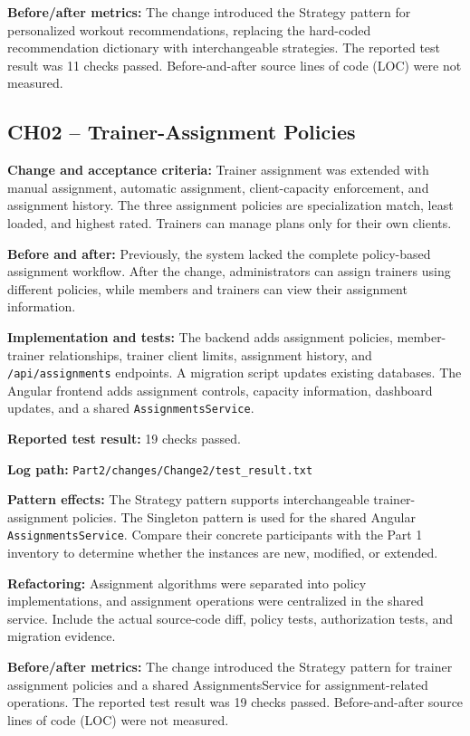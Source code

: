 \documentclass[11pt,a4paper]{article}
\begin{document}
\textbf{Before/after metrics:}
The change introduced the Strategy pattern for personalized
workout recommendations, replacing the hard-coded recommendation
dictionary with interchangeable strategies. The reported test
result was 11 checks passed. Before-and-after source lines of
code (LOC) were not measured.

\subsection*{CH02 -- Trainer-Assignment Policies}

\textbf{Change and acceptance criteria:}
Trainer assignment was extended with manual assignment, automatic
assignment, client-capacity enforcement, and assignment history.
The three assignment policies are specialization match, least loaded,
and highest rated. Trainers can manage plans only for their own clients.

\textbf{Before and after:}
Previously, the system lacked the complete policy-based assignment
workflow. After the change, administrators can assign trainers using
different policies, while members and trainers can view their
assignment information.

\textbf{Implementation and tests:}
The backend adds assignment policies, member-trainer relationships,
trainer client limits, assignment history, and
\texttt{/api/assignments} endpoints. A migration script updates
existing databases. The Angular frontend adds assignment controls,
capacity information, dashboard updates, and a shared
\texttt{AssignmentsService}.

\textbf{Reported test result:} 19 checks passed.

\textbf{Log path:}
\texttt{Part2/changes/Change2/test\_result.txt}

\textbf{Pattern effects:}
The Strategy pattern supports interchangeable trainer-assignment
policies. The Singleton pattern is used for the shared Angular
\texttt{AssignmentsService}. Compare their concrete participants
with the Part 1 inventory to determine whether the instances are
new, modified, or extended.

\textbf{Refactoring:}
Assignment algorithms were separated into policy implementations,
and assignment operations were centralized in the shared service.
Include the actual source-code diff, policy tests, authorization
tests, and migration evidence.

\textbf{Before/after metrics:}
The change introduced the Strategy pattern for trainer assignment
policies and a shared AssignmentsService for assignment-related
operations. The reported test result was 19 checks passed.
Before-and-after source lines of code (LOC) were not measured.
\end{document}
